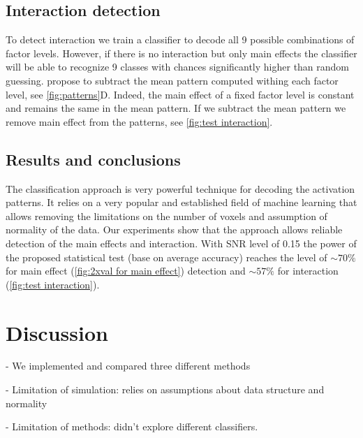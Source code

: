 \documentclass[paper=a4,fontsize=12pt]{scrartcl}
\numberwithin{equation}{section} %
\numberwithin{figure}{section} %
\numberwithin{table}{section} %
\begin{document}
\subsection{Interaction detection}

To detect interaction  we train a classifier to decode all 9 possible combinations of factor levels. However, if there is no interaction but only main effects the classifier will be able to recognize 9 classes with chances significantly higher than random guessing. \cite{Kornysheva2014} propose to subtract the mean pattern computed withing each factor level, see \autoref{fig:patterns}D. Indeed, the main effect of a fixed factor level is constant and remains the same in the mean pattern. If we subtract the mean pattern we remove main effect from the patterns, see \autoref{fig:test interaction}.

\subsection{Results and conclusions}

The classification approach is very powerful technique for decoding the activation patterns. It relies on a very popular and established field of machine learning that allows removing the limitations on the number of voxels and assumption of normality of the data. Our experiments show that the approach allows reliable detection of the main effects and interaction. With SNR level of 0.15 the power of the proposed statistical test (base on average accuracy) reaches the level of $\sim70\%$ for main effect (\autoref{fig:2xval for main effect}) detection and $\sim57\%$ for interaction (\autoref{fig:test interaction}).

\section{Discussion}

 - We implemented and compared three different methods

 - Limitation of simulation: relies on assumptions about data structure and normality

 - Limitation of methods: didn't explore different classifiers.



\end{document}
